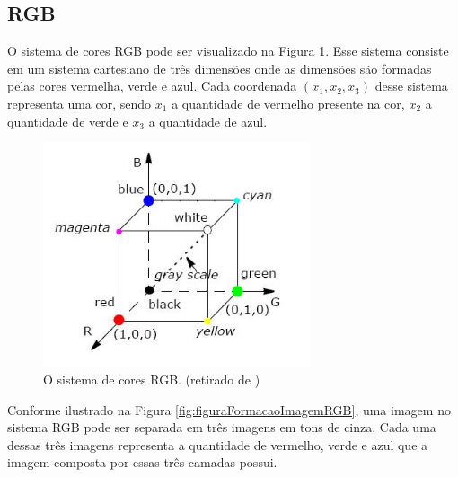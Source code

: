 \documentclass[	12pt, Times, openright, twoside, a4paper, english, brazil]{abntex2}
\begin{document}
\subsection{RGB}

O sistema de cores RGB pode ser visualizado na Figura \ref{fig:figuraRGB}. Esse sistema consiste em um sistema cartesiano de três dimensões onde as dimensões são formadas pelas cores vermelha, verde e azul. Cada coordenada $(x_1, x_2, x_3)$ desse sistema representa uma cor, sendo $x_1$ a quantidade de vermelho presente na cor, $x_2$ a quantidade de verde e $x_3$ a quantidade de azul.

\begin{figure}[!htb]
\centering \includegraphics[width=0.7\textwidth]{figuraRGB.png}
\caption{O sistema de cores RGB. (retirado de ) \label{fig:figuraRGB}}
\end{figure}

Conforme ilustrado na Figura \ref{fig:figuraFormacaoImagemRGB}, uma imagem no sistema RGB pode ser separada em três imagens em tons de cinza. Cada uma dessas três imagens representa a quantidade de vermelho, verde e azul que a imagem composta por essas três camadas possui.
\end{document}
